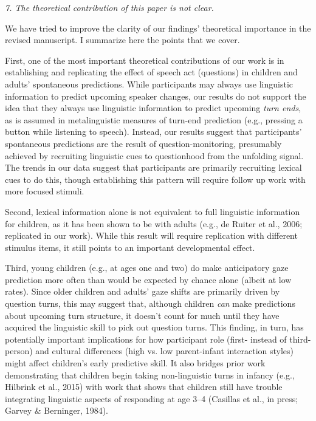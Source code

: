 \documentclass[11pt,a4paper]{letter} %
\begin{document}
\begin{letter}{}
\smallskip

\noindent \textit{7. The theoretical contribution of this paper is not clear.}

\noindent We have tried to improve the clarity of our findings' theoretical importance in the revised manuscript. I summarize here the points that we cover. 

First, one of the most important theoretical contributions of our work is in establishing and replicating the effect of speech act (questions) in children and adults' spontaneous predictions. While participants may always use linguistic information to predict upcoming speaker changes, our results do not support the idea that they always use linguistic information to predict upcoming \emph{turn ends}, as is assumed in metalinguistic measures of turn-end prediction (e.g., pressing a button while listening to speech). Instead, our results suggest that participants' spontaneous predictions are the result of question-monitoring, presumably achieved by recruiting linguistic cues to questionhood from the unfolding signal. The trends in our data suggest that participants are primarily recruiting lexical cues to do this, though establishing this pattern will require follow up work with more focused stimuli.

Second, lexical information alone is not equivalent to full linguistic information for children, as it has been shown to be with adults (e.g., de Ruiter et al., 2006; replicated in our work). While this result will require replication with different stimulus items, it still points to an important developmental effect. 

Third, young children (e.g., at ages one and two) do make anticipatory gaze prediction more often than would be expected by chance alone (albeit at low rates). Since older children and adults' gaze shifts are primarily driven by question turns, this may suggest that, although children \textit{can} make predictions about upcoming turn structure, it doesn't count for much until they have acquired the linguistic skill to pick out question turns. This finding, in turn, has potentially important implications for how participant role (first- instead of third-person) and cultural differences (high vs. low parent-infant interaction styles) might affect children's early predictive skill. It also bridges prior work demonstrating that children begin taking non-linguistic turns in infancy (e.g., Hilbrink et al., 2015) with work that shows that children still have trouble integrating linguistic aspects of responding at age 3--4 (Casillas et al., in press; Garvey \& Berninger, 1984).


\end{letter}
\end{document}
